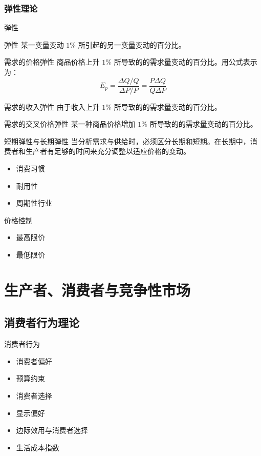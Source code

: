 \documentclass[UTF8]{ctexbeamer}
\begin{document}
\subsubsection{弹性理论}
\begin{frame}{弹性}
\begin{block}{弹性}
某一变量变动 $ 1\% $ 所引起的另一变量变动的百分比。
\end{block}
\begin{block}{需求的价格弹性}
商品价格上升 $ 1\% $ 所导致的的需求量变动的百分比。用公式表示为：
\begin{equation*}
E_p = \frac{\Delta Q / Q}{\Delta P / P} = \frac{P\Delta Q}{Q\Delta P}
\end{equation*}
\end{block}
\begin{block}{需求的收入弹性}
由于收入上升 $ 1\% $ 所导致的的需求量变动的百分比。
\end{block}
\begin{block}{需求的交叉价格弹性}
某一种商品价格增加 $ 1\% $ 所导致的的需求量变动的百分比。
\end{block}
\end{frame}

\begin{frame}{短期弹性与长期弹性}
\linespread{1.5}
当分析需求与供给时，必须区分长期和短期。在长期中，消费者和生产者有足够的时间来充分调整以适应价格的变动。
\begin{itemize}
\item 消费习惯
\item 耐用性
\item 周期性行业
\end{itemize}
\end{frame}

\begin{frame}{价格控制}
\linespread{1.5}
\begin{itemize}
\item 最高限价
\item 最低限价
\end{itemize}
\end{frame}

\section{生产者、消费者与竞争性市场}

\subsection{消费者行为理论}
\begin{frame}{消费者行为}
\begin{itemize}
\item 消费者偏好
\item 预算约束
\item 消费者选择
\item 显示偏好
\item 边际效用与消费者选择
\item 生活成本指数
\end{itemize}
\end{frame}
\end{document}
